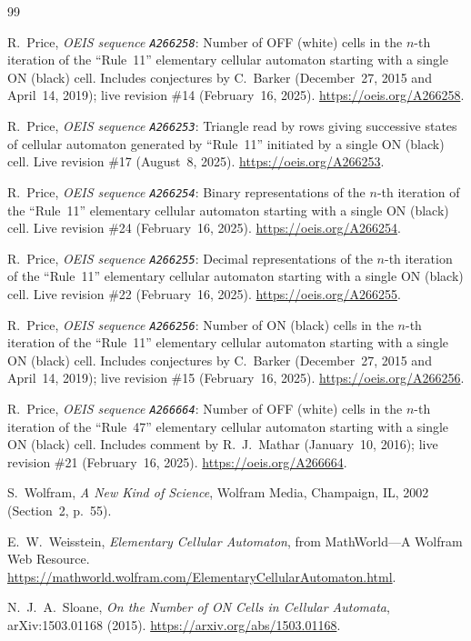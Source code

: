 \documentclass[11pt]{article}
\theoremstyle{definition}
\newcommand{\seq}[1]{\texttt{#1}}
\begin{document}
{\small
\begin{thebibliography}{99}\setlength{\itemsep}{2pt}
\raggedright

R.\ Price, \emph{OEIS sequence \seq{A266258}}: Number of OFF (white) cells in the $n$-th iteration of the ``Rule~11'' elementary cellular automaton starting with a single ON (black) cell. Includes conjectures by C.\ Barker (December~27, 2015 and April~14, 2019); live revision \#14 (February~16, 2025). \url{https://oeis.org/A266258}.

R.\ Price, \emph{OEIS sequence \seq{A266253}}: Triangle read by rows giving successive states of cellular automaton generated by ``Rule~11'' initiated by a single ON (black) cell. Live revision \#17 (August~8, 2025). \url{https://oeis.org/A266253}.

R.\ Price, \emph{OEIS sequence \seq{A266254}}: Binary representations of the $n$-th iteration of the ``Rule~11'' elementary cellular automaton starting with a single ON (black) cell. Live revision \#24 (February~16, 2025). \url{https://oeis.org/A266254}.

R.\ Price, \emph{OEIS sequence \seq{A266255}}: Decimal representations of the $n$-th iteration of the ``Rule~11'' elementary cellular automaton starting with a single ON (black) cell. Live revision \#22 (February~16, 2025). \url{https://oeis.org/A266255}.

R.\ Price, \emph{OEIS sequence \seq{A266256}}: Number of ON (black) cells in the $n$-th iteration of the ``Rule~11'' elementary cellular automaton starting with a single ON (black) cell. Includes conjectures by C.\ Barker (December~27, 2015 and April~14, 2019); live revision \#15 (February~16, 2025). \url{https://oeis.org/A266256}.

R.\ Price, \emph{OEIS sequence \seq{A266664}}: Number of OFF (white) cells in the $n$-th iteration of the ``Rule~47'' elementary cellular automaton starting with a single ON (black) cell. Includes comment by R.~J.\ Mathar (January~10, 2016); live revision \#21 (February~16, 2025). \url{https://oeis.org/A266664}.

S.\ Wolfram, \emph{A New Kind of Science}, Wolfram Media, Champaign, IL, 2002 (Section~2, p.~55).

E.~W.\ Weisstein, \emph{Elementary Cellular Automaton}, from MathWorld---A Wolfram Web Resource. \url{https://mathworld.wolfram.com/ElementaryCellularAutomaton.html}.

N.~J.~A.\ Sloane, \emph{On the Number of ON Cells in Cellular Automata}, arXiv:1503.01168 (2015). \url{https://arxiv.org/abs/1503.01168}.

\end{thebibliography}
}
\end{document}
